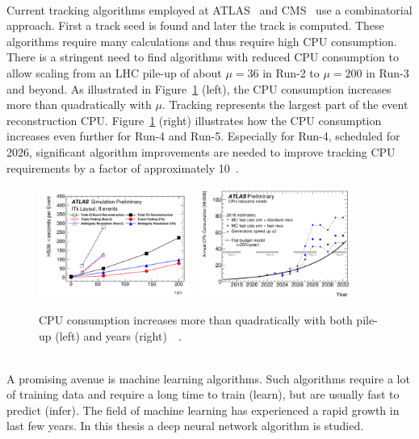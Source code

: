 \ \\Current tracking algorithms employed at ATLAS~\cite{TrackingATLAS} and CMS~\cite{TrackingCMS} use a combinatorial approach. First a track seed is found and later the track is computed. These algorithms require many calculations and thus require high CPU consumption. There is a stringent need to find algorithms with reduced CPU consumption to allow scaling from an LHC pile-up of about $\mu=36$ in Run-2 to $\mu=200$ in Run-3 and beyond. As illustrated in Figure~\ref{fig:CPU} (left), the CPU consumption increases more than quadratically with $\mu$. Tracking represents the largest part of the event reconstruction CPU. Figure~\ref{fig:CPU} (right) illustrates how the CPU consumption increases even further for Run-4 and Run-5. Especially for Run-4, scheduled for 2026, significant algorithm improvements are needed to improve tracking CPU requirements by a factor of approximately 10~\cite{TrackMLPPTBefore}.


\begin{figure}[htb]
\centering
\includegraphics[width=0.45\textwidth]{./plots/CPU1.png}
\includegraphics[width=0.45\textwidth]{./plots/CPU2.png}
\caption{CPU consumption increases more than quadratically with both pile-up (left) and years (right)~\cite{TrackMLPPTAfter}~\cite{TrackMLPPTAfter2}.}
\label{fig:CPU}
\end{figure}

\ \\A promising avenue is machine learning algorithms. Such algorithms require a lot of training data and require a long time to train (learn), but are usually fast to predict (infer). The field of machine learning has experienced a rapid growth in last few years. In this thesis a deep neural network algorithm is studied.
